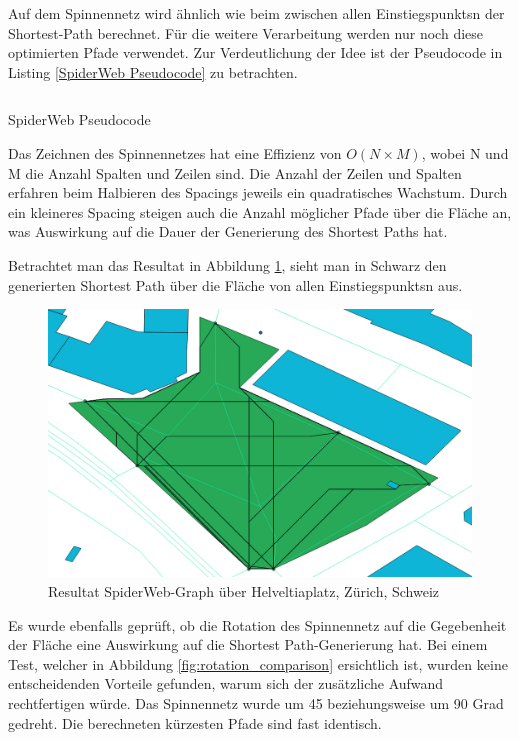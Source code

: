 Auf dem Spinnennetz wird ähnlich wie beim  zwischen allen \glspl{Einstiegspunkt}n der Shortest-Path berechnet. Für die weitere Verarbeitung werden nur noch diese optimierten Pfade verwendet. Zur Verdeutlichung der Idee ist der Pseudocode in Listing \ref{SpiderWeb Pseudocode} zu betrachten.

\begin{listing}[ht]
    \inputminted{python}{technicalreport/listing/spiderweb_pseudocode.py}
    \caption{SpiderWeb Pseudocode}
    \label{SpiderWeb Pseudocode}
\end{listing}

Das Zeichnen des Spinnennetzes hat eine Effizienz von \(O(N\times M)\), wobei N und M die Anzahl Spalten und Zeilen sind. Die Anzahl der Zeilen und Spalten erfahren beim Halbieren des Spacings jeweils ein quadratisches Wachstum. Durch ein kleineres Spacing steigen auch die Anzahl möglicher Pfade über die Fläche an, was Auswirkung auf die Dauer der Generierung des Shortest Paths hat. 

Betrachtet man das Resultat in Abbildung \ref{fig:spiderweb_result}, sieht man in Schwarz den generierten Shortest Path über die Fläche von allen \glspl{Einstiegspunkt}n aus.

\begin{figure}[th]
\centering
\includegraphics[width=0.7\linewidth]{technicalreport/img/spiderweb_result}
\caption[Resultat SpiderWeb-Graph]{Resultat SpiderWeb-Graph über Helveltiaplatz, Zürich, Schweiz}
\label{fig:spiderweb_result}
\end{figure}

Es wurde ebenfalls geprüft, ob die Rotation des Spinnennetz auf die Gegebenheit der Fläche eine Auswirkung auf die Shortest Path-Generierung hat. Bei einem Test, welcher in Abbildung \ref{fig:rotation_comparison} ersichtlich ist, wurden keine entscheidenden Vorteile gefunden, warum sich der zusätzliche Aufwand rechtfertigen würde. Das Spinnennetz wurde um 45 beziehungsweise um 90 Grad gedreht. Die berechneten kürzesten Pfade sind fast identisch.

